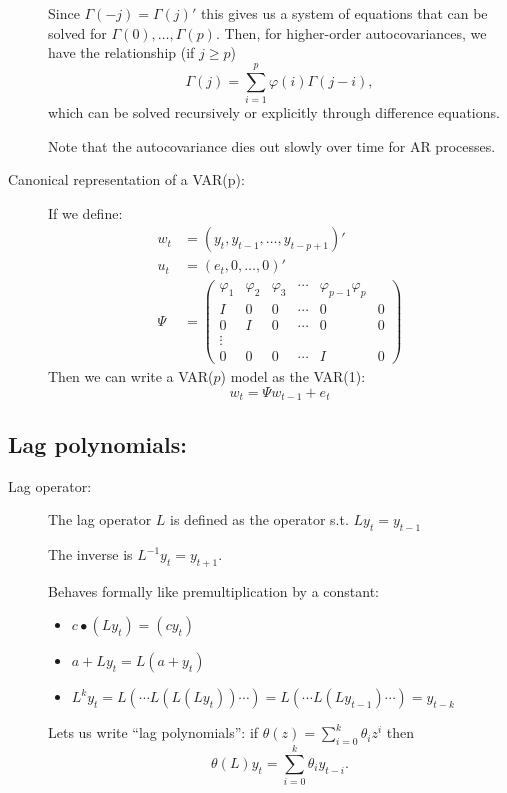 \begin{description}
  Since $Γ(-j) = Γ(j)'$ this gives us a system of equations that can
  be solved for $Γ(0),…,Γ(p)$. Then, for higher-order autocovariances,
  we have the relationship (if $j ≥ p$)
  \[Γ(j) = \sum_{i=1}^p φ(i) Γ(j-i),\]
  which can be solved recursively or explicitly through difference
  equations.

  Note that the autocovariance dies out slowly over time for AR
  processes.
\item[Canonical representation of a VAR(p):]
If we define: 
\begin{align}
  w_t &= (y_t, y_{t-1}, …, y_{t-p+1})' \\
  u_t &= (e_t, 0, …, 0)' \\
  Ψ &= \begin{pmatrix}
    φ_1 & φ_2 & φ_3 & ⋯ & φ_{p-1} φ_p \\
    I & 0 & 0 & ⋯ & 0 & 0 \\
    0 & I & 0 & ⋯ & 0 & 0 \\
    ⋮ \\
    0 & 0 & 0 & ⋯ & I & 0
  \end{pmatrix}
\end{align}
Then we can write a VAR($p$) model as the VAR(1): 
\[w_t = Ψ w_{t-1} + e_t\]
\end{description}

\subsection{Lag polynomials:}

\begin{description}
\item[Lag operator:]

  The lag operator $L$ is defined as the operator s.t. $L y_t =
  y_{t-1}$

  The inverse is $L^{-1} y_t = y_{t+1}$.

  Behaves formally like premultiplication by a constant:
  \begin{itemize}
  \item $c ∙ (L y_t) = (c y_t)$
  \item $a + L y_t = L (a + y_t)$
  \item $L^k y_t = L(⋯ L(L(L y_t)) ⋯) = L(⋯ L(L y_{t-1}) ⋯) = y_{t-k}$
  \end{itemize}
  Lets us write ``lag polynomials'': 
  if $θ(z) = \sum_{i=0}^k θ_i z^i$ then 
  \[θ(L) y_t = \sum_{i=0}^k θ_i y_{t-i}.\]
\end{description}

